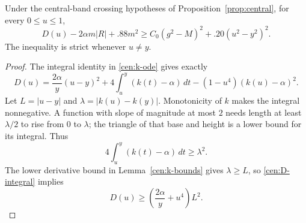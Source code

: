 \begin{lemma}\label{cen:pointwise}
Under the central-band crossing hypotheses of Proposition~\ref{prop:central},
for every $0\le u\le1$,
\begin{equation}\label{cen:pointwise-bound}
 D(u)-2\alpha m|R|+.88m^2
 \ge C_0(g^2-M)^2+.20(u^2-y^2)^2.
\end{equation}
The inequality is strict whenever $u\ne y$.
\end{lemma}

\begin{proof}
The integral identity in \eqref{cen:k-ode} gives exactly
\begin{equation}\label{cen:D-integral}
 D(u)=\frac{2\alpha}{y}(u-y)^2
       +4\int_u^y(k(t)-\alpha)\,dt
       -(1-u^4)(k(u)-\alpha)^2.
\end{equation}
Let $L=|u-y|$ and $\lambda=|k(u)-k(y)|$.  Monotonicity of $k$ makes
the integral nonnegative.  A function with slope of magnitude at most
$2$ needs length at least $\lambda/2$ to rise from $0$ to $\lambda$;
the triangle of that base and height is a lower bound for its integral.
Thus
\[
 4\int_u^y(k(t)-\alpha)\,dt\ge\lambda^2.
\]
The lower derivative bound in Lemma~\ref{cen:k-bounds} gives
$\lambda\ge L$, so \eqref{cen:D-integral} implies
\begin{equation}\label{cen:D-lower}
 D(u)\ge\left(\frac{2\alpha}{y}+u^4\right)L^2.
\end{equation}


\end{proof}
